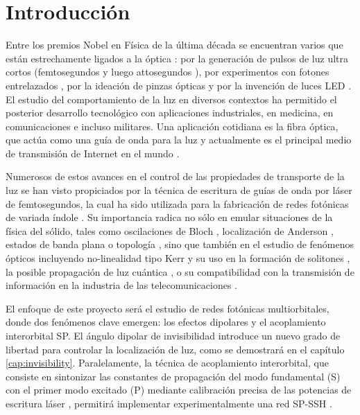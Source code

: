 \chapter{Introducción}

Entre los premios Nobel en Física de la última década se encuentran varios que están estrechamente ligados a la óptica \cite{nobel}: por la generación de pulsos de luz ultra cortos (femtosegundos \cite{femto1} y luego attosegundos \cite{atto1, atto2, atto3}), por experimentos con fotones entrelazados \cite{photons1, photons2, photons3}, por la ideación de pinzas ópticas \cite{opticaltweezers} y por la invención de luces LED \cite{led1, led2, led3}. El estudio del comportamiento de la luz en diversos contextos ha permitido el posterior desarrollo tecnológico con aplicaciones industriales, en medicina, en comunicaciones e incluso militares. Una aplicación cotidiana es la fibra óptica, que actúa como una guía de onda para la luz y actualmente es el principal medio de transmisión de Internet en el mundo \cite{fibra2, fibra}. 

Numerosos de estos avances en el control de las propiedades de transporte de la luz se han visto propiciados por la técnica de escritura de guías de onda por láser de femtosegundos, la cual ha sido utilizada para la fabricación de redes fotónicas de variada índole \cite{femto, bics, lieb1, lieb2, artificialFB, FBdynamics, strain, dendritas, splitters}. Su importancia radica no sólo en emular situaciones de la física del sólido, tales como oscilaciones de Bloch \cite{BlochOsci}, localización de Anderson \cite{Anderson}, estados de banda plana \cite{lieb1, lieb2, artificialFB, FBdynamics} o topología \cite{obstopo, obsfloquet, topo1dphoto,toporusos}, sino que también en el estudio de fenómenos ópticos incluyendo no-linealidad tipo Kerr y su uso en la formación de solitones \cite{discretesolitons}, la posible propagación de luz cuántica \cite{qed, squeezed, topoquantum}, o su compatibilidad con la transmisión de información en la industria de las telecomunicaciones \cite{telecom}.

El enfoque de este proyecto será el estudio de redes fotónicas multiorbitales, donde dos fenómenos clave emergen: los efectos dipolares y el acoplamiento interorbital SP. El ángulo dipolar de invisibilidad \cite{Pmodecoupling} introduce un nuevo grado de libertad para controlar la localización de luz, como se demostrará en el capítulo \ref{cap:invisibility}. Paralelamente, la técnica de acoplamiento interorbital, que consiste en sintonizar las constantes de propagación del modo fundamental (S) con el primer modo excitado (P) mediante calibración precisa de las potencias de escritura láser \cite{interorbital}, permitirá implementar experimentalmente una red SP-SSH \citep{SPSSH}. 

